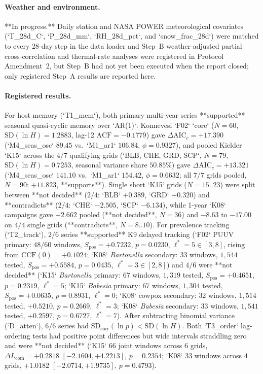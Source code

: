\paragraph{Weather and environment.}
**In progress.** Daily station and NASA POWER meteorological covariates (`T\_28d\_C`, `P\_28d\_mm`, `RH\_28d\_pct`, and `snow\_frac\_28d`) were matched to every 28-day step in the data loader and Step~B weather-adjusted partial cross-correlation and thermal-rate analyses were registered in Protocol Amendment~2, but Step~B had not yet been executed when the report closed; only registered Step~A results are reported here.

\paragraph{Registered results.}
For host memory (`T1\_mem`), both primary multi-year series **supported** seasonal quasi-cyclic memory over `AR(1)`: Konnevesi `F02` `core` ($N = 60$, $\mathrm{SD}(\ln H) = 1.2883$, lag-12 $\mathrm{ACF} = -0.1779$) gave $\Delta\mathrm{AIC}_c = +17.390$ (`M4\_seas\_osc` $89.45$ vs.\ `M1\_ar1` $106.84$, $\phi = 0.9327$), and pooled Kielder `K15` across the $4/7$ qualifying grids (`BLB, CHE, GRD, SCP`, $N = 79$, $\mathrm{SD}(\ln H) = 0.7253$, seasonal variance share $50.85\%$) gave $\Delta\mathrm{AIC}_c = +13.321$ (`M4\_seas\_osc` $141.10$ vs.\ `M1\_ar1` $154.42$, $\phi = 0.6632$; all $7/7$ grids pooled, $N = 90$: $+11.823$, **supports**). Single short `K15` grids ($N = 15..23$) were split between **not decided** ($2/4$: `BLB` $+0.389$, `GRD` $+0.320$) and **contradicts** ($2/4$: `CHE` $-2.505$, `SCP` $-6.134$), while 1-year `K08` campaigns gave $+2.662$ pooled (**not decided**, $N = 36$) and $-8.63$ to $-17.00$ on $4/4$ single grids (**contradicts**, $N = 8..10$). For prevalence tracking (`T2\_track`), $2/6$ series **supported** K9 delayed tracking (`F02` PUUV primary: $48/60$ windows, $S_{\mathrm{pos}} = +0.7232$, $p = 0.0230$, $\ell^* = 5 \in [3, 8]$, rising from $\mathrm{CCF}(0) = +0.1024$; `K08` \textit{Bartonella} secondary: $33$ windows, $1{,}544$ tested, $S_{\mathrm{pos}} = +0.5584$, $p = 0.0435$, $\ell^* = 3 \in [2, 8]$) and $4/6$ were **not decided** (`K15` \textit{Bartonella} primary: $67$ windows, $1{,}319$ tested, $S_{\mathrm{pos}} = +0.4651$, $p = 0.2319$, $\ell^* = 5$; `K15` \textit{Babesia} primary: $67$ windows, $1{,}304$ tested, $S_{\mathrm{pos}} = +0.0635$, $p = 0.8931$, $\ell^* = 0$; `K08` cowpox secondary: $32$ windows, $1{,}514$ tested, $+0.5210$, $p = 0.2669$, $\ell^* = 3$; `K08` \textit{Babesia} secondary: $33$ windows, $1{,}541$ tested, $+0.2597$, $p = 0.6727$, $\ell^* = 7$). After subtracting binomial variance (`D\_atten`), $6/6$ series had $\mathrm{SD}_{\mathrm{corr}}(\ln p) < \mathrm{SD}(\ln H)$. Both `T3\_order` lag-ordering tests had positive point differences but wide intervals straddling zero and were **not decided** (`K15` $66$ joint windows across $6$ grids, $\Delta L_{\mathrm{com}} = +0.2818$ $[-2.1604, +4.2213]$, $p = 0.2354$; `K08` $33$ windows across $4$ grids, $+1.0182$ $[-2.0714, +1.9735]$, $p = 0.4793$).

